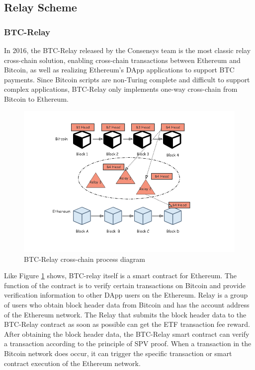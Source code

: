 \subsection{Relay Scheme}
\subsubsection{BTC-Relay}
\noindent In 2016, the BTC-Relay released by the Consensys team is the most classic relay cross-chain solution, enabling cross-chain transactions between Ethereum and Bitcoin, as well as realizing Ethereum's DApp applications to support BTC payments. Since Bitcoin scripts are non-Turing complete and difficult to support complex applications, BTC-Relay only implements one-way cross-chain from Bitcoin to Ethereum.
        \begin{figure}[H]
        \includegraphics[width=1\textwidth]{./figures/btc.png}
        \centering
        \caption{BTC-Relay cross-chain process diagram}%
        \centering
        \label{fig:btc}
        \end{figure}
\noindent Like Figure \ref{fig:btc} shows, BTC-relay itself is a smart contract for Ethereum. The function of the contract is to verify certain transactions on Bitcoin and provide verification information to other DApp users on the Ethereum. Relay is a group of users who obtain block header data from Bitcoin and has the account address of the Ethereum network. The Relay that submits the block header data to the BTC-Relay contract as soon as possible can get the ETF transaction fee reward. After obtaining the block header data, the BTC-Relay smart contract can verify a transaction according to the principle of SPV proof. When a transaction in the Bitcoin network does occur, it can trigger the specific transaction or smart contract execution of the Ethereum network.


